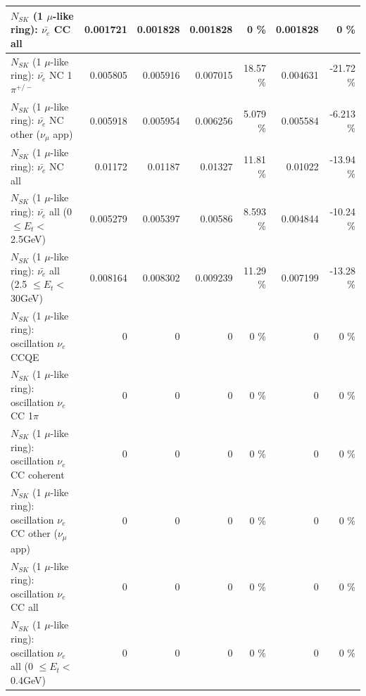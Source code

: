 \begin{table}
\begin{tabular}{| l | r | r | r  r | r  r |}
                            $N_{SK}$ (1 $\mu$-like ring): $\bar{\nu_{e}}$ CC all &        0.001721 &        0.001828 &        0.001828 &        0 \%  &        0.001828 &        0 \%  \\ 
\hline
                     $N_{SK}$ (1 $\mu$-like ring): $\bar{\nu_e}$ NC 1$\pi^{+/-}$ &        0.005805 &        0.005916 &        0.007015 &    18.57 \%  &        0.004631 &   -21.72 \%  \\ 
            $N_{SK}$ (1 $\mu$-like ring): $\bar{\nu_e}$ NC other ($\nu_\mu$ app) &        0.005918 &        0.005954 &        0.006256 &    5.079 \%  &        0.005584 &   -6.213 \%  \\ 
                            $N_{SK}$ (1 $\mu$-like ring): $\bar{\nu_{e}}$ NC all &         0.01172 &         0.01187 &         0.01327 &    11.81 \%  &         0.01022 &   -13.94 \%  \\ 
\hline
     $N_{SK}$ (1 $\mu$-like ring): $\bar{\nu_{e}}$ all (0 $\leq E_{t} <$ 2.5GeV) &        0.005279 &        0.005397 &         0.00586 &    8.593 \%  &        0.004844 &   -10.24 \%  \\ 
    $N_{SK}$ (1 $\mu$-like ring): $\bar{\nu_{e}}$ all (2.5 $\leq E_{t} <$ 30GeV) &        0.008164 &        0.008302 &        0.009239 &    11.29 \%  &        0.007199 &   -13.28 \%  \\ 
\hline
\hline
\hline
                          $N_{SK}$ (1 $\mu$-like ring): oscillation $\nu_e$ CCQE &               0 &               0 &               0 &        0 \%  &               0 &        0 \%  \\ 
                     $N_{SK}$ (1 $\mu$-like ring): oscillation $\nu_e$ CC 1$\pi$ &               0 &               0 &               0 &        0 \%  &               0 &        0 \%  \\ 
                   $N_{SK}$ (1 $\mu$-like ring): oscillation $\nu_e$ CC coherent &               0 &               0 &               0 &        0 \%  &               0 &        0 \%  \\ 
      $N_{SK}$ (1 $\mu$-like ring): oscillation $\nu_e$ CC other ($\nu_\mu$ app) &               0 &               0 &               0 &        0 \%  &               0 &        0 \%  \\ 
                       $N_{SK}$ (1 $\mu$-like ring): oscillation $\nu_e$  CC all &               0 &               0 &               0 &        0 \%  &               0 &        0 \%  \\ 
\hline
$N_{SK}$ (1 $\mu$-like ring): oscillation $\nu_{e}$ all (0 $\leq E_{t} <$ 0.4GeV) &               0 &               0 &               0 &        0 \%  &               0 &        0 \%  \\ 

\end{tabular}
\end{table}
